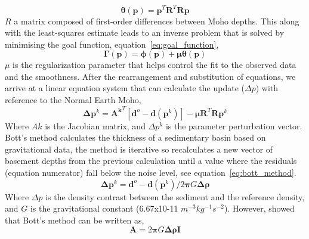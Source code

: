 \begin{equation}
  \mathbf{\theta}(\mathbf{p}) =
    \mathbf{p}^T\mathbf{R}^T\mathbf{R}\mathbf{p}
  \label{eq:regularization}
\end{equation}
$R$ a matrix composed of first-order differences between Moho depths. This along with the least-squares estimate leads to an inverse problem that is solved by minimising the goal function, equation~\ref{eq:goal_function},
\begin{equation}
  \mathbf{\Gamma(p)} =
    \mathbf{\phi(p)} + \mathbf{\mu}\mathbf{\theta(p)}
  \label{eq:goal_function}
\end{equation}
$\mu$ is the regularization parameter that helps control the fit to the observed data and the smoothness.
After the rearrangement and substitution of equations, we arrive at a linear equation system that can calculate the update ($\Delta p$) with reference to the Normal Earth Moho,
\begin{equation}
  [\mathbf{\mathbf{A}^k}^T\mathbf{A}^k + \mathbf{\mu}\mathbf{R}^T\mathbf{R}] \mathbf{\Delta}\mathbf{p}^k =
    \mathbf{\mathbf{A}^k}^T [\mathbf{d}^o - \mathbf{d}(\mathbf{p}^k)] - \mathbf{\mu}\mathbf{R}^T\mathbf{R}\mathbf{p}^k
  \label{eq:linear_equation_system}
\end{equation}
Where $Ak$ is the Jacobian matrix, and $\Delta p^k$ is the parameter perturbation vector.
Bott's method \cite{Bott1960} calculates the thickness of a sedimentary basin based on gravitational data, the method is iterative so recalculates a new vector of basement depths from the previous calculation until a value where the residuals (equation numerator) fall below the noise level, see equation~\ref{eq:bott_method}.
\begin{equation}
  \mathbf{\Delta}\mathbf{p}^k =
    \mathbf{d}^o - \mathbf{d}(\mathbf{p}^k) /
    {2}\mathbf{\pi}{G}\mathbf{\Delta}\mathbf{\rho}
  \label{eq:bott_method}
\end{equation}
Where $\Delta p$ is the density contrast between the sediment and the reference density, and $G$ is the gravitational constant (6.67x10-11 $m^{-3} kg^{-1} s^{-2}$). However, \cite{Silva2014} showed that Bott's method can be written as,
\begin{equation}
  \mathbf{A} =
    {2}\mathbf{\pi}{G}\mathbf{\Delta}\mathbf{\rho}\mathbf{I}
  \label{eq:special_bott}
\end{equation}
